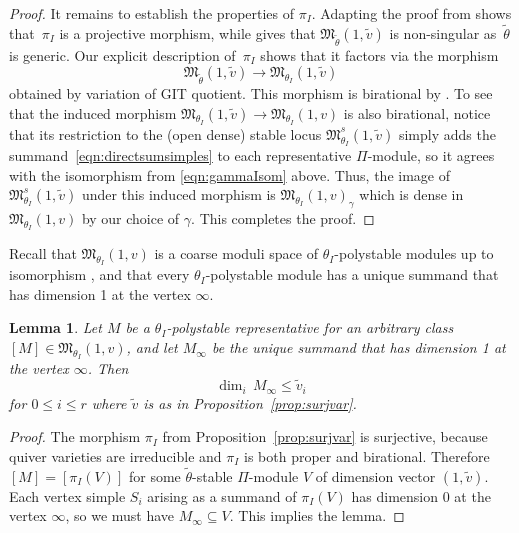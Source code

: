 \documentclass[10pt,a4paper]{amsart}
\newtheorem{Lemma}[Theorem]{Lemma}
\numberwithin{equation}{section}
\begin{document}
\begin{proof}
 It remains to establish the properties of $\pi_I$. Adapting the proof from \cite[Lemma~2.4]{bellamy2016symplectic} shows that~$\pi_I$ is a projective morphism, while \cite[Theorem~1.15]{bellamy2016symplectic} gives that $ \mathfrak{M}_{\widetilde{\theta}}(1,\widetilde{v})$ is non-singular as~$\widetilde{\theta}$ is generic. Our explicit description of~$\pi_I$ shows that it factors via the morphism
\begin{equation*}%
\mathfrak{M}_{\widetilde{\theta}}(1,\widetilde{v}) \to \mathfrak{M}_{\theta_I}(1,\widetilde{v})
\end{equation*}
obtained by variation of GIT quotient. This morphism is birational by \cite[Lemma~2.12]{nakajima2009quiver}. To see that the induced morphism $\mathfrak{M}_{\theta_I}(1,\widetilde{v}) \to \mathfrak{M}_{\theta_I}(1,v)$ is also birational, notice that its restriction to the (open dense) stable locus $\mathfrak{M}^s_{\theta_I}(1,\widetilde{v})$ simply adds the summand~\eqref{eqn:directsumsimples} to each representative $\Pi$-module, so it agrees with the isomorphism from \eqref{eqn:gammaIsom} above. Thus, the image of $\mathfrak{M}^s_{\theta_I}(1,\widetilde{v})$ under this induced morphism is $\mathfrak{M}_{\theta_I}(1,v)_\gamma$ which is dense in $\mathfrak{M}_{\theta_I}(1,v)$ by our choice of $\gamma$. This completes the proof.
 \end{proof}

Recall that $\mathfrak{M}_{\theta_I}(1,v)$ is a coarse moduli space of $\theta_I$-polystable modules up to
isomorphism \cite[Proposition 2.9(2)]{nakajima2009quiver}, and that every $\theta_I$-polystable module has a unique summand that has dimension 1 at the vertex $\infty$.
\begin{Lemma}
\label{lem:vwtildev}
Let $M$ be a $\theta_I$-polystable representative for an arbitrary class $[M] \in \mathfrak{M}_{\theta_I}(1,v)$, and let $M_{\infty}$ be the unique summand that has dimension 1 at the vertex $\infty$.
Then
\[ \dim_i\,M_{\infty} \leq \widetilde{v}_i\]
for $0 \leq i \leq r$ where $\widetilde{v}$ is as in Proposition~{\rm \ref{prop:surjvar}}.
\end{Lemma}
\begin{proof}
{The morphism $\pi_I$ from Proposition~\ref{prop:surjvar} is surjective, because quiver varieties are irreducible and $\pi_I$ is both proper and birational. Therefore $[M]=[\pi_I(V)]$ for some $\tilde{\theta}$-stable $\Pi$-module $V$ of dimension vector $(1,\tilde{v})$. Each vertex simple $S_i$ arising as a summand of $\pi_I(V)$} has dimension 0 at the vertex $\infty$, {so }we must have $M_{\infty} \subseteq {V}$. This implies the lemma.
\end{proof}
\end{document}
